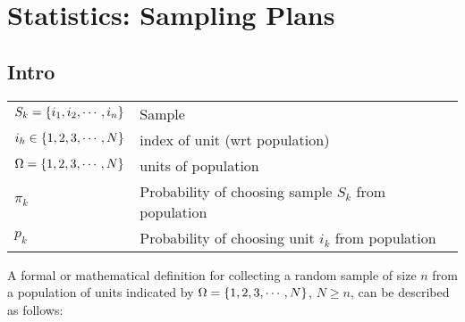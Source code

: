 \chapter{Statistics: Sampling Plans \cite{ism-1}}

\section*{Intro \cite{ism-1}}

\begin{alternateColorTable}
\renewcommand{\arraystretch}{1.3}
\begin{longtable}{l l}
    $S_k = \left\{i_1,i_2,\cdots,i_n\right\}$ & Sample \\

    $i_h \in \left\{1, 2, 3,\cdots, N\right\}$ & index of unit (wrt population) \\

    $\Omega = \left\{1, 2, 3, \cdots, N\right\}$ & units of population \\

    $\pi_k$ & Probability of choosing sample $S_k$ from population\\

    $p_k$ & Probability of choosing unit $i_k$ from population\\
\end{longtable}
\renewcommand{\arraystretch}{1}
\end{alternateColorTable}

A formal or mathematical definition for collecting a random sample of size $n$ from a population of units indicated by $\Omega = \left\{1, 2, 3, \cdots, N\right\}$, $N \geq n$, can be described as follows:

